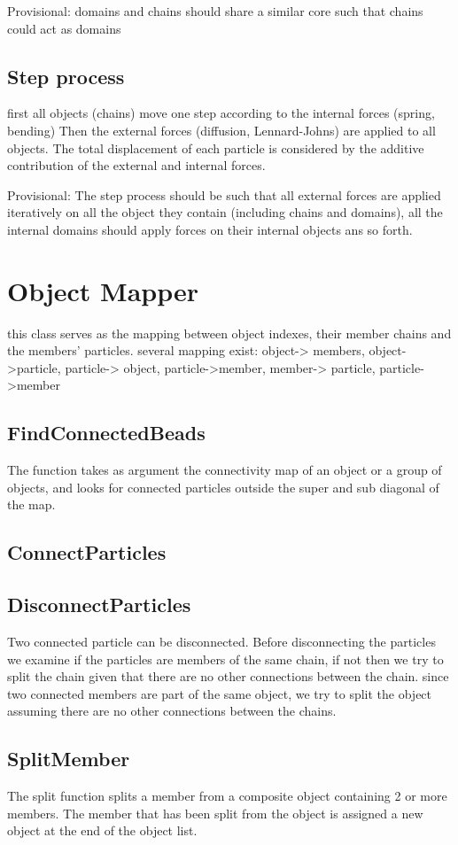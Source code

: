 \documentclass[12pt]{report}
\begin{document}
Provisional: domains and chains should share a similar core such that chains could act as domains 

\subsection{Step process}
first all objects (chains) move one step according to the internal forces (spring, bending)
Then the external forces (diffusion, Lennard-Johns) are applied to all objects. 
The total displacement of each particle is considered by the additive contribution of the external and internal forces. 

Provisional: The step process should be such that all external forces are applied iteratively on all the object they contain (including chains and domains), all the internal domains should apply forces on their internal objects ans so forth. 

\section{Object Mapper}
this class serves as the mapping between object indexes, their member chains and the members' particles. 
several mapping exist: object-> members, object->particle, particle-> object,  particle->member, member-> particle, particle->member

\subsection{FindConnectedBeads}
The function takes as argument the connectivity map of an object or a group of objects, and looks for connected particles outside the super and sub diagonal of the map. 

\subsection{ConnectParticles}


\subsection{DisconnectParticles}
Two connected particle can be disconnected. Before disconnecting the particles we examine if the particles are members of the same chain, if not then we try to split the chain given that there are no other connections between the chain.
since two connected members are part of the same object, we try to split the object assuming there are no other connections between the chains.

\subsection{SplitMember}
The split function splits a member from a composite object containing 2 or more members. The member that has been split from the object is assigned a new object at the end of the object list.  
\end{document}
